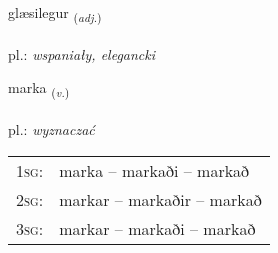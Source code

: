 \documentclass[frontgrid, backgrid]{flacards}\usepackage[]{graphicx}\usepackage[]{xcolor}
\begin{document}
\renewcommand{\flhead}{\vskip5pt \fboxsep=0pt {\small\bfseries\footnotesize Lýsingarorð | Adjective}}
\renewcommand{\fcfoot}{\vskip5pt \fboxsep=0pt \hspace{2pt}{\small\bfseries\footnotesize 2K}}

\renewcommand{\blhead}{\vskip5pt {\small\bfseries\footnotesize Lýsingarorð | Adjective }}
\renewcommand{\bcfoot}{\vskip5pt \hspace{2pt}{\small\bfseries\footnotesize 2K}}


{glæsilegur \small{\textsubscript{(\textit{adj.})}} \\[1ex] %
\textphonetic{[klaiːsɪlɛɣʏr]} \\
pl.: \emph{wspaniały, elegancki} \\  [2ex]
\renewcommand*{\arraystretch}{0.8}
}

\renewcommand{\flhead}{\vskip5pt \fboxsep=0pt {\small\bfseries\footnotesize Sagnorð | Verb}}
\renewcommand{\fcfoot}{\vskip5pt \fboxsep=0pt \hspace{2pt}{\small\bfseries\footnotesize 2K}}

\renewcommand{\blhead}{\vskip5pt {\small\bfseries\footnotesize Sagnorð | Verb }}
\renewcommand{\bcfoot}{\vskip5pt \hspace{2pt}{\small\bfseries\footnotesize 2K}}


{marka \small{\textsubscript{(\textit{v.})}} \\[1ex] %
\textphonetic{[mar̥ka]} \\
pl.: \emph{wyznaczać} \\  [2ex]
\renewcommand*{\arraystretch}{0.8}
\begin{tabular}{p{1cm}l}
\textsc{1sg}: & marka -- markaði -- markað \\ 
\textsc{2sg}: & markar -- markaðir -- markað \\ 
\textsc{3sg}: & markar -- markaði -- markað \\ 
\end{tabular}
}
\end{document}
